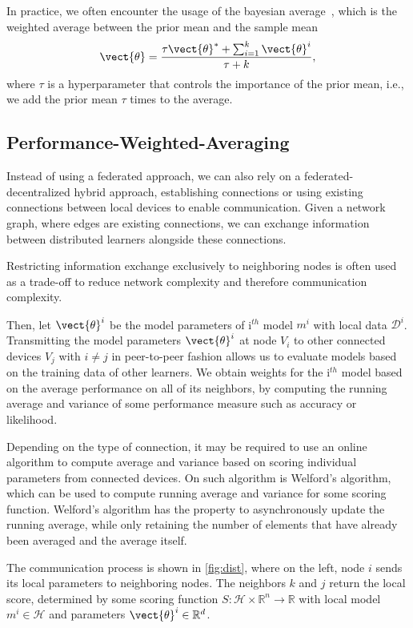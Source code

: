 In practice, we often encounter the usage of the bayesian average~\cite{de2011bayesian}, which is the weighted average between the prior mean and the sample mean
\begin{equation}
    \vect{\theta} = \frac{\tau \vect{\theta}^* + \sum_{i=1}^k \vect{\theta}^i}{\tau + k},
\end{equation}
where $\tau$ is a hyperparameter that controls the importance of the prior mean, i.e., we add the prior mean $\tau$ times to the average. 

\subsection{Performance-Weighted-Averaging}

Instead of using a federated approach, we can also rely on a federated-decentralized hybrid approach, establishing connections or using existing connections between local devices to enable communication.
Given a network graph, where edges are existing connections, we can exchange information between distributed learners alongside these connections.

Restricting information exchange exclusively to neighboring nodes is often used as a trade-off to reduce network complexity and therefore communication complexity.

Then, let $\vect{\theta}^{i}$ be the model parameters of i$^{th}$ model $m^{i}$ with local data $\mathcal{D}^{i}$.
Transmitting the model parameters $\vect{\theta}^{i}$  at node $V_i$  to other connected devices  $V_j$ with $i \neq j$ in peer-to-peer fashion allows us to evaluate models based on the training data of other learners.
We obtain weights for the i$^{th}$ model based on the average performance on all of its neighbors, by computing the running average and variance of some performance measure such as accuracy or likelihood.

Depending on the type of connection, it may be required to use an online algorithm to compute average and variance based on scoring individual parameters from connected devices.
On such algorithm is Welford's algorithm, which can be used to compute running average and variance for some scoring function.
Welford's algorithm has the property to asynchronously update the running average, while only retaining the number of elements that have already been averaged and the average itself.

The communication process is shown in  \autoref{fig:dist}, where on the left, node $i$ sends its local parameters to neighboring nodes. The neighbors $k$ and $j$ return the local score, determined by some scoring function $S: \mathcal{H} \times \mathbb{R}^n \rightarrow \mathbb{R}$ with local model $m^{i} \in \mathcal{H}$ and parameters $\vect{\theta}^{i} \in \mathbb{R}^d$.


